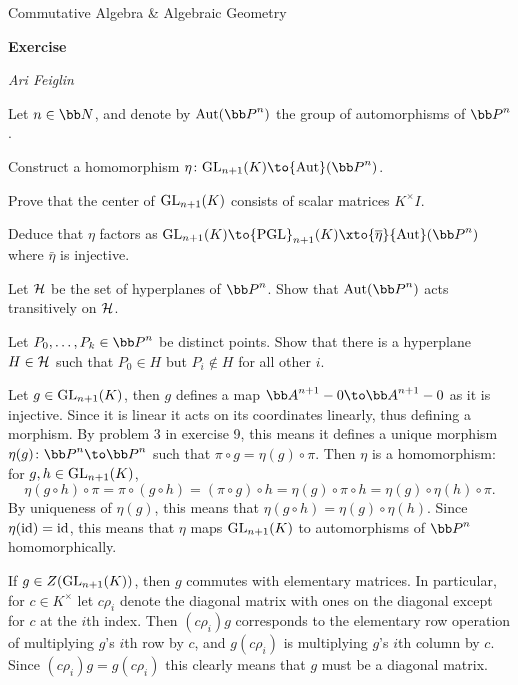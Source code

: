 


\def\enumindent{0cm}

\def\printmcount{\the\counter{section}.\the\counter{math counter}}
\setcounter{section}{10}

\centerline{Commutative Algebra \& Algebraic Geometry}
\medskip
\centerline{\bf Exercise \the{}}
\smallskip
\centerline{\it Ari Feiglin}

\def\pgl{{\rm PGL}}
\def\aut{{\rm Aut}}

\bprob

    Let $n\in\bN$, and denote by $\aut(\bP^n)$ the group of automorphisms of $\bP^n$.
    \benum
        \item Construct a homomorphism $\eta\colon\gl_{n+1}(K)\to\aut(\bP^n)$.
        \item Prove that the center of ${\rm GL}_{n+1}(K)$ consists of scalar matrices $K^\times I$.
        \item Deduce that $\eta$ factors as $\gl_{n+1}(K)\to\pgl_{n+1}(K)\xto{\bar\eta}\aut(\bP^n)$ where $\bar\eta$ is injective.
        \item Let ${\cal H}$ be the set of hyperplanes of $\bP^n$.
        Show that $\aut(\bP^n)$ acts transitively on ${\cal H}$.
        \item Let $P_0,\dots,P_k\in\bP^n$ be distinct points.
        Show that there is a hyperplane $H\in{\cal H}$ such that $P_0\in H$ but $P_i\notin H$ for all other $i$.
    \eenum

\eprob

\benum
    \item Let $g\in{\rm GL}_{n+1}(K)$, then $g$ defines a map $\bA^{n+1}-0\to\bA^{n+1}-0$ as it is injective.
    Since it is linear it acts on its coordinates linearly, thus defining a morphism.
    By problem 3 in exercise 9, this means it defines a unique morphism $\eta(g)\colon\bP^n\to\bP^n$ such that $\pi\circ g=\eta(g)\circ\pi$.
    Then $\eta$ is a homomorphism: for $g,h\in{\rm GL}_{n+1}(K)$,
    $$ \eta(g\circ h)\circ\pi = \pi\circ(g\circ h) = (\pi\circ g)\circ h = \eta(g)\circ \pi\circ h = \eta(g)\circ\eta(h)\circ\pi . $$
    By uniqueness of $\eta(g)$, this means that $\eta(g\circ h)=\eta(g)\circ\eta(h)$.
    Since $\eta({\rm id})={\rm id}$, this means that $\eta$ maps ${\rm GL}_{n+1}(K)$ to automorphisms of $\bP^n$ homomorphically.

    \item If $g\in Z({\rm GL}_{n+1}(K))$, then $g$ commutes with elementary matrices.
    In particular, for $c\in K^\times$ let $c\rho_i$ denote the diagonal matrix with ones on the diagonal except for $c$ at the $i$th index.
    Then $(c\rho_i)g$ corresponds to the elementary row operation of multiplying $g$'s $i$th row by $c$, and $g(c\rho_i)$ is multiplying $g$'s $i$th column by $c$.
    Since $(c\rho_i)g=g(c\rho_i)$ this clearly means that $g$ must be a diagonal matrix.

